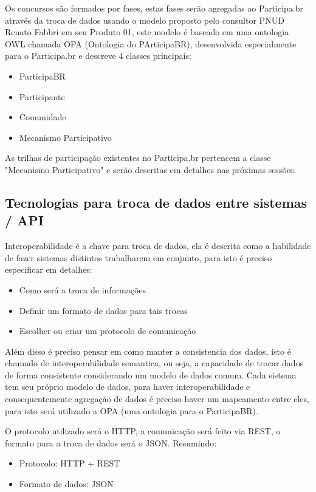 \documentclass[12pt]{article}
\begin{document}
Os concursos são formados por fases, estas fases serão agregadas ao
Participa.br através da troca de dados usando o modelo proposto pelo consultor
PNUD Renato Fabbri em seu Produto 01\cite{fabri}, este modelo é baseado em uma
ontologia OWL chamada OPA (Ontologia do PArticipaBR), desenvolvida
especialmente para o Participa.br e descreve 4 classes principais:

\begin{itemize}
  \item ParticipaBR
  \item Participante
  \item Comunidade
  \item Mecanismo Participativo
\end{itemize}

As trilhas de participação existentes no Participa.br pertencem a classe "Mecanismo
Participativo" e serão descritas em detalhes nas próximas sessões.

\subsection{Tecnologias para troca de dados entre sistemas / API}

Interoperabilidade é a chave para troca de dados, ela é descrita como a
habilidade de fazer sistemas distintos trabalharem em conjunto, para isto é
preciso especificar em detalhes:

\begin{itemize}
  \item Como será a troca de informações
  \item Definir um formato de dados para tais trocas
  \item Escolher ou criar um protocolo de comunicação
\end{itemize}

Além disso é preciso pensar em como manter a consistencia dos dados, isto é
chamado de interoperabilidade semantica, ou seja, a capacidade de trocar dados
de forma consistente considerando um modelo de dados comum. Cada sistema tem
seu próprio modelo de dados, para haver interoperabilidade e consequentemente
agregação de dados é preciso haver um mapeamento entre eles, para isto será
utilizado a OPA (uma ontologia para o ParticipaBR).

O protocolo utilizado será o HTTP, a comunicação será feito via REST,
o formato para a troca de dados será o JSON\cite{json}. Resumindo:

\begin{itemize}
  \item Protocolo: HTTP + REST
  \item Formato de dados: JSON
\end{itemize}
\end{document}
